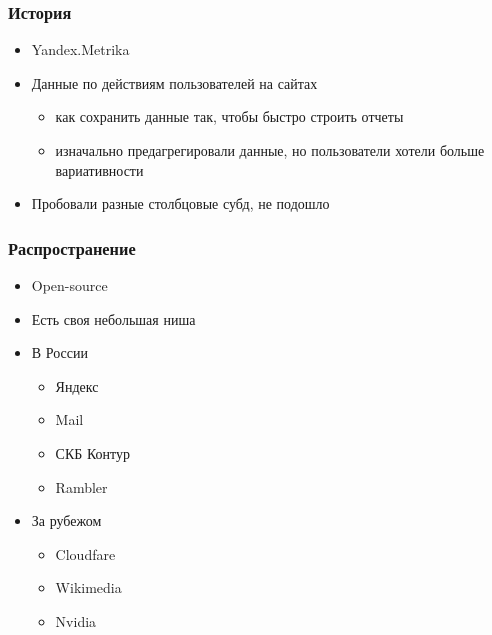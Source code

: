 \documentclass[xetex,mathserif,serif]{beamer}
\begin{document}
\begin{frame}
	\frametitle{История}

	\begin{itemize}
		\item Yandex.Metrika
		\item Данные по действиям пользователей на сайтах
		      \begin{itemize}
			      \item как сохранить данные так, чтобы быстро строить отчеты
			      \item изначально предагрегировали данные, но пользователи хотели больше вариативности
		      \end{itemize}
		\item Пробовали разные столбцовые субд, не подошло
	\end{itemize}
\end{frame}


\begin{frame}
	\frametitle{Распространение}

	\begin{itemize}
		\item Open-source
		\item Есть своя небольшая ниша
		\item В России
		      \begin{itemize}
			      \item Яндекс
			      \item Mail
			      \item СКБ Контур
			      \item Rambler
		      \end{itemize}
		\item За рубежом
		      \begin{itemize}
			      \item Cloudfare
			      \item Wikimedia
			      \item Nvidia
		      \end{itemize}
	\end{itemize}
\end{frame}
\end{document}
